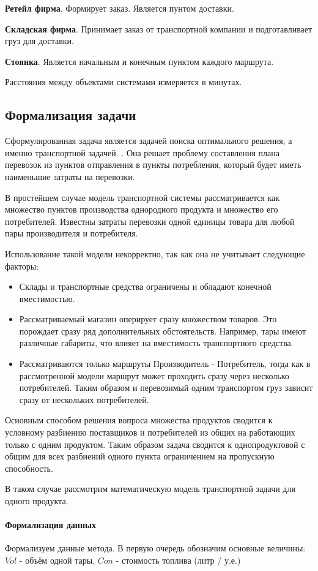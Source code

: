 	\textbf{Ретейл фирма}. Формирует заказ. Является пунтом доставки.
	
	\textbf{Складская фирма}. Принимает заказ от транспортной компании и подготавливает груз для доставки.
	
	\textbf{Стоянка}. Является начальным и конечным пунктом каждого маршрута.
	
	Расстояния между объектами системами измеряется в минутах.

\subsection{Формализация задачи}
	Сформулированная задача является задачей поиска оптимального решения, а именно транспортной задачей. \cite{trans:main}. Она решает проблему составления плана перевозок из пунктов отправления в пункты потребления, который будет иметь наименьшие затраты на перевозки. 
	
	В простейшем случае модель транспортной системы рассматривается как множество пунктов производства однородного продукта и множество его потребителей. Известны затраты перевозки одной единицы товара для любой пары производителя и потребителя.
	
	Использование такой модели некорректно, так как она не учитывает следующие факторы:
	\begin{itemize}
		\item Склады и транспортные средства ограничены и обладают конечной вместимостью.
		\item Рассматриваемый магазин оперирует сразу множеством товаров. Это порождает сразу ряд дополнительных обстоятельств. Например, тары имеют различные габариты, что влияет на вместимость транспортного средства.
		\item Рассматриваются только маршруты Производитель - Потребитель, тогда как в рассмотренной модели маршрут может проходить сразу через несколько потребителей. Таким образом и перевозимый одним транспортом груз зависит сразу от нескольких потребителей.
	\end{itemize}
		
	Основным способом решения вопроса множества продуктов сводится к условному разбиению поставщиков и потребителей из общих на работающих только с одним продуктом. Таким образом задача сводится к однопродуктовой с общим для всех разбиений одного пункта ограничением на пропускную способность.
	
	В таком случае рассмотрим математическую модель транспортной задачи для одного продукта.
	\paragraph{Формализация данных}
	Формализуем данные метода. В первую очередь обозначим основные величины: $Vol$ - объём одной тары, $Con$ - стоимость топлива (литр / у.е.)
	
